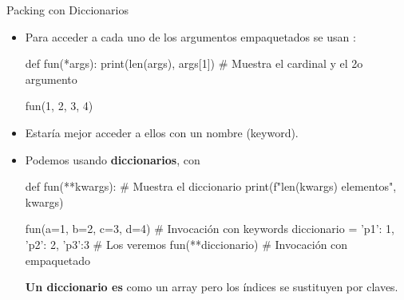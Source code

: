 \documentclass[10pt,envcountsect,spanish]{beamer}
\begin{document}
\begin{frame}[fragile]{Packing con Diccionarios}

\begin{itemize}\setlength{\itemsep}{0mm}

\item Para acceder a cada uno de los argumentos empaquetados se usan :

\begin{pyconsole}[][frame=single, fontsize=\footnotesize]
def fun(*args): 
    print(len(args), args[1]) # Muestra el cardinal y el 2o argumento

fun(1, 2, 3, 4)
\end{pyconsole}


\item Estaría mejor acceder a ellos con un nombre (keyword).

\item Podemos  usando \textbf{diccionarios}, con \cm{**}

\begin{pyconsole}[][frame=single, fontsize=\footnotesize]
def fun(**kwargs): 
    # Muestra el diccionario
    print(f"{len(kwargs)} elementos", kwargs) 

fun(a=1, b=2, c=3, d=4)    # Invocación con keywords
diccionario = {'p1': 1, 'p2': 2, 'p3':3}  # Los veremos
fun(**diccionario)         # Invocación con empaquetado
\end{pyconsole}

\textbf{Un diccionario es} como un array pero los índices se sustituyen por claves.
\end{itemize}
\end{frame}
\end{document}
